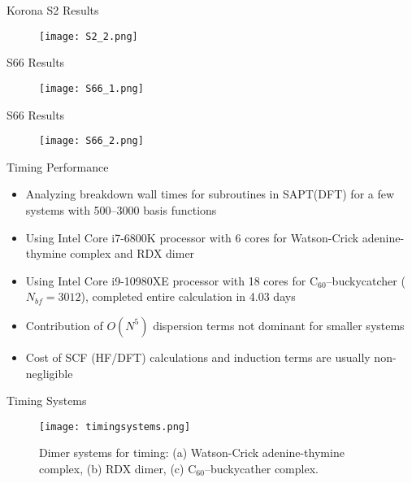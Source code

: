 \documentclass{beamer}
\begin{document}
        \begin{frame}{Korona S2 Results}
            \begin{figure}
                \centering
                \texttt{[image: S2\_2.png]}
            \end{figure}  
        \end{frame}

        \begin{frame}{S66 Results}
            \begin{figure}
                \centering
                \texttt{[image: S66\_1.png]}
            \end{figure}  
        \end{frame}

        \begin{frame}{S66 Results}
            \begin{figure}
                \centering
                \texttt{[image: S66\_2.png]}
            \end{figure}  
        \end{frame}

        \begin{frame}{Timing Performance}
            \begin{itemize}
                \item Analyzing breakdown wall times for subroutines in SAPT(DFT) for a few systems with 500--3000 basis functions
                \item Using Intel Core i7-6800K processor with 6 cores for Watson-Crick adenine-thymine complex and RDX dimer 
                \item Using Intel Core i9-10980XE processor with 18 cores for C$_{60}$--buckycatcher ($N_{bf} = 3012$), completed entire calculation in 4.03 days
                \item Contribution of $O(N^5)$ dispersion terms not dominant for smaller systems
                \item Cost of SCF (HF/DFT) calculations and induction terms are usually non-negligible 
            \end{itemize}
        \end{frame}

        \begin{frame}{Timing Systems}
            \begin{figure}
                \centering
                \texttt{[image: timingsystems.png]}
                \caption{Dimer systems for timing: (a) Watson-Crick adenine-thymine complex, (b) RDX dimer, (c) C$_{60}$--buckycather complex.}
            \end{figure}
        \end{frame}
\end{document}
